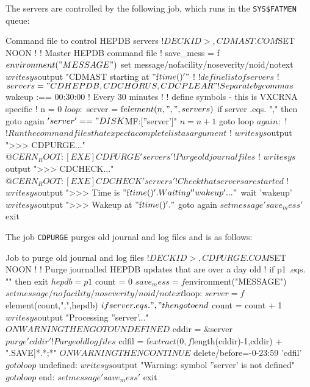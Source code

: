 The servers are controlled by the following job, which runs in the
{\tt SYS\$FATMEN} queue:

\begin{XMPt}{Command file to control HEPDB servers}
$!DECK ID>, CDMAST.COM
$SET NOON
$ !
$ !   Master HEPDB command file
$ !
$     save_mess = f$environment("MESSAGE")
$     set message/nofacility/noseverity/noid/notext
$     write sys$output "CDMAST starting at ''f$time()'"
$ !
$ !   define list of servers
$ !
$     servers  = "CDHEPDB,CDCHORUS,CDCPLEAR" ! Separate by commas
$     wakeup :== 00:30:00                    ! Every 30 minutes
$ !
$ !   define symbols - this is VXCRNA specific
$ !
$     n = 0
$ loop:
$     server    = f$element(n,",",servers)
$     if server .eqs. "," then goto again
$     'server' == "DISK$MF:[''server']"
$     n         = n + 1
$     goto loop
$ again:
$ !
$ !   Run the command files that expect a complete list as argument
$ !
$     write sys$output ">>> CDPURGE..."
$     @CERN_ROOT:[EXE]CDPURGE 'servers'  ! Purge old journal files
$ !
$     write sys$output ">>> CDCHECK..."
$     @CERN_ROOT:[EXE]CDCHECK 'servers'  ! Check that servers are started
$ !
$     write sys$output ">>> Time is ''f$time()'. Waiting ''wakeup'..."
$     wait 'wakeup'
$     write sys$output ">>> Wakeup at ''f$time()'."
$     goto again
$     set message 'save_mess'
$     exit
\end{XMPt}

The job {\tt CDPURGE} purges old journal and log files and is as
follows:

\begin{XMPt}{Job to purge old journal and log files}
$!DECK ID>, CDPURGE.COM
$SET NOON
$ !
$ ! Purge journalled HEPDB updates that are over a day old
$ !
$ if p1 .eqs. "" then exit
$ hepdb =  p1
$ count  = 0
$ save_mess = f$environment("MESSAGE")
$ set message/nofacility/noseverity/noid/notext
$loop:
$ server = f$element(count,",",hepdb)
$ if server .eqs. "," then goto end
$ count  = count + 1
$ write sys$output "Processing ''server'..."
$ ON WARNING THEN GOTO UNDEFINED
$ cddir = &server
$ purge 'cddir' ! Purge old log files
$ cdfil = f$extract(0,f$length(cddir)-1,cddir) + ".SAVE]*.*;*"
$ ON WARNING THEN CONTINUE
$ delete/before=-0-23:59 'cdfil'
$ goto loop
$ undefined:
$ write sys$output "Warning: symbol ''server' is not defined"
$ goto loop
$ end:
$ set message 'save_mess'
$ exit
\end{XMPt}

